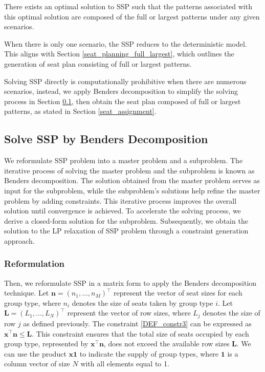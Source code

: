 
\begin{prop}\label{prop_solution}
There exists an optimal solution to SSP such that the patterns associated with this optimal solution are composed of the full or largest patterns under any given scenarios.
\end{prop}

When there is only one scenario, the SSP reduces to the deterministic model. This aligns with Section \ref{seat_planning_full_largest}, which outlines the generation of seat plan consisting of full or largest patterns.

Solving SSP directly is computationally prohibitive when there are numerous scenarios, instead, we apply Benders decomposition to simplify the solving process in Section \ref{solve_by_benders}, then obtain the seat plan composed of full or largest patterns, as stated in Section \ref{seat_assignment}.

\subsection{Solve SSP by Benders Decomposition}\label{solve_by_benders}
We reformulate SSP problem into a master problem and a subproblem. The iterative process of solving the master problem and the subproblem is known as Benders decomposition. 
The solution obtained from the master problem serves as input for the subproblem, while the subproblem's solutions help refine the master problem by adding constraints. This iterative process improves the overall solution until convergence is achieved. To accelerate the solving process, we derive a closed-form solution for the subproblem. Subsequently, we obtain the solution to the LP relaxation of SSP problem through a constraint generation approach.

\subsubsection{Reformulation}
Then, we reformulate SSP in a matrix form to apply the Benders decomposition technique. Let $\mathbf{n} = (n_1, \ldots, n_M)^{\intercal}$ represent the vector of seat sizes for each group type, where $n_i$ denotes the size of seats taken by group type $i$. Let $\mathbf{L} = (L_1, \ldots, L_N)^{\intercal}$ represent the vector of row sizes, where $L_j$ denotes the size of row $j$ as defined previously.
The constraint \eqref{DEF_constr3} can be expressed as $\mathbf{x}^{\intercal} \mathbf{n} \leq \mathbf{L}$. This constraint ensures that the total size of seats occupied by each group type, represented by $\mathbf{x}^{\intercal} \mathbf{n}$, does not exceed the available row sizes $\mathbf{L}$. We can use the product $\mathbf{x} \mathbf{1}$ to indicate the supply of group types, where $\mathbf{1}$ is a column vector of size $N$ with all elements equal to 1. 

